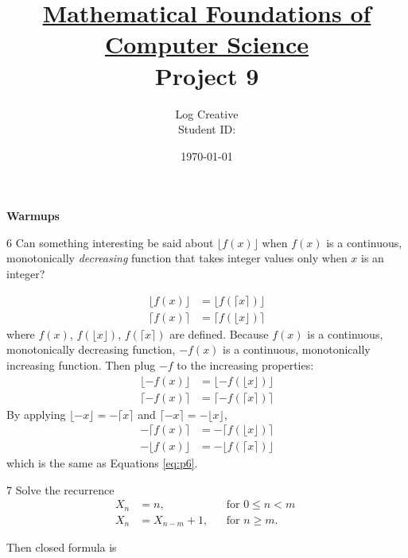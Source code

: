 \documentclass[a4paper,12pt]{article}
\title{\small \underline{Mathematical Foundations of Computer Science}\\\Large Project 9}
\author{Log Creative\\\small Student ID: }
\date{\today}
\makeatletter
\newtheorem*{solution}{Solution}
\theoremstyle{definition}
\renewenvironment{solution}[1][Solution] {\par\pushQED{\qed}\normalfont\topsep6\p@\@plus6\p@\relax\trivlist\item[\hskip\labelsep\bfseries#1\@addpunct{.}]\ignorespaces}{\popQED\endtrivlist\@endpefalse} \makeatother
\newenvironment{problems}{\begin{list}{}{\renewcommand{\makelabel}[1]{\textbf{##1}\hfil}}}{\end{list}}
\makeatother
\begin{document}
\maketitle

\noindent\textbf{Warmups}

\begin{problems}
    \item[6] Can something interesting be said about $\lfloor f(x)\rfloor$ when $f(x)$ is a continuous, monotonically \emph{decreasing} function that takes integer values only when $x$ is an integer?
    \begin{solution}
        \begin{equation}\label{eq:p6}
            \begin{aligned}
            \lfloor f(x)\rfloor &=\lfloor f(\lceil x\rceil)\rfloor\\
            \lceil f(x) \rceil &= \lceil f(\lfloor x \rfloor)\rceil
            \end{aligned}
        \end{equation}
        where $f(x)$, $f(\lfloor x\rfloor)$, $f(\lceil x\rceil)$ are defined. Because $f(x)$ is a continuous, monotonically decreasing function, $-f(x)$ is a continuous, monotonically increasing function. Then plug $-f$ to the increasing properties:
        \begin{align*}
            \lfloor -f(x) \rfloor &= \lfloor -f(\lfloor x\rfloor)\rfloor\\
            \lceil -f(x) \rceil &=\lceil -f(\lceil x\rceil)\rceil
        \end{align*}
        By applying $\lfloor -x \rfloor=-\lceil x\rceil$ and $\lceil -x \rceil=-\lfloor x\rfloor$,
        \begin{align*}
            -\lceil f(x) \rceil &= -\lceil f(\lfloor x\rfloor)\rceil\\
            -\lfloor f(x) \rfloor &=-\lfloor f(\lceil x\rceil)\rfloor
        \end{align*}
        which is the same as Equations \eqref{eq:p6}.
    \end{solution} 
    \item[7] Solve the recurrence
    \begin{align*}
        X_n&=n,&&\text{for }0\leq n<m\;\\
        X_n&=X_{n-m}+1,&&\text{for }n\geq m.
    \end{align*} 
    \begin{solution}
        Then closed formula is
        \begin{equation}\label{eq:p7}

\end{equation}
\end{solution}
\end{problems}
\end{document}

